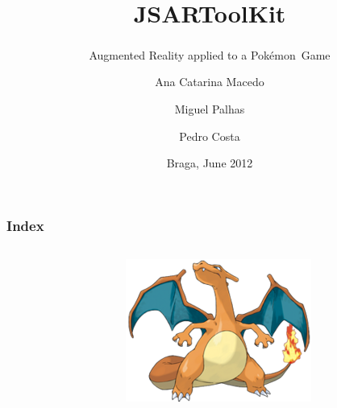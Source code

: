 \documentclass{beamer}
\title{JSARToolKit}
\subtitle{Augmented Reality applied to a Pokémon\textsuperscript{\textregistered}\ Game}
\author[A.C.Macedo \and M.Palhas \and P.Costa]{Ana Catarina Macedo
\and Miguel Palhas
\and Pedro Costa}
\institute[]{
	University of Minho\\
	Department of Informatics
}
\date{Braga, June 2012}
\begin{document}

\frame[plain]{\titlepage}

\begin{frame}
	\frametitle{Index}
	\begin{columns}
		\begin{column}{0.4\linewidth}
			\tableofcontents[subsectionstyle=show/show/hide]
		\end{column}
		\begin{column}{0.5\linewidth}
			\begin{figure}
				\begin{center}
					\includegraphics[width=\textwidth]{slides/images/charizard.png}
				\end{center}
			\end{figure}
		\end{column}
	\end{columns}
\end{frame}
\end{document}
